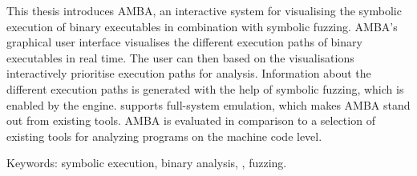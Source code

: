 This thesis introduces AMBA, an interactive system for visualising the symbolic execution of binary executables in combination with symbolic fuzzing.
AMBA's graphical user interface visualises the different execution paths of binary executables in real time.
The user can then based on the visualisations interactively prioritise execution paths for analysis.
Information about the different execution paths is generated with the help of symbolic fuzzing, which is enabled by the \stoe{} engine.
\stoe{} supports full-system emulation, which makes AMBA stand out from existing tools.
AMBA is evaluated in comparison to a selection of existing tools for analyzing programs on the machine code level.

Keywords: symbolic execution, binary analysis, \stoe{}, fuzzing.
